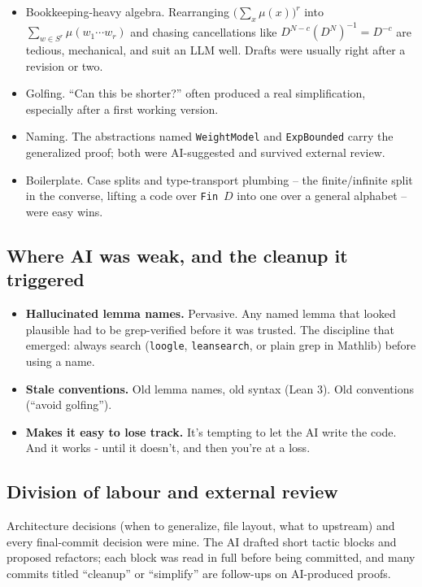 \documentclass[11pt]{article}
\begin{document}
\begin{itemize}[leftmargin=1.5em,itemsep=0pt]
  \item Bookkeeping-heavy algebra. Rearranging
    $\bigl(\sum_x \mu(x)\bigr)^r$ into $\sum_{w \in S^r} \mu(w_1 \cdots w_r)$
    and chasing cancellations like $D^{N-c}(D^N)^{-1} = D^{-c}$ are
    tedious, mechanical, and suit an LLM well. Drafts were usually right
    after a revision or two.
  \item Golfing. ``Can this be shorter?'' often produced a real
    simplification, especially after a first working version.
  \item Naming. The abstractions named \texttt{WeightModel} and
    \texttt{ExpBounded} carry the generalized proof; both were
    AI-suggested and survived external review.
  \item Boilerplate. Case splits and type-transport plumbing -- the
    finite/infinite split in the converse, lifting a code over
    \texttt{Fin}~$D$ into one over a general alphabet -- were easy wins.
\end{itemize}

\subsection*{Where AI was weak, and the cleanup it triggered}

\begin{itemize}[leftmargin=1.5em,itemsep=0pt]
  \item \textbf{Hallucinated lemma names.} Pervasive. Any named lemma that
    looked plausible had to be grep-verified before it was trusted. The
    discipline that emerged: always search (\texttt{loogle},
    \texttt{leansearch}, or plain grep in \textsf{Mathlib}) before using
    a name.
    
  \item \textbf{Stale conventions.} Old lemma names, old syntax (Lean 3). Old conventions (``avoid golfing'').

  \item \textbf{Makes it easy to lose track.} It's tempting to let the AI write the code. And it works - until it doesn't, and then you're at a loss.
\end{itemize}

\subsection*{Division of labour and external review}

Architecture decisions (when to generalize, file layout, what to upstream)
and every final-commit decision were mine. The AI drafted short tactic
blocks and proposed refactors; each block was read in full before being
committed, and many commits titled ``cleanup'' or ``simplify'' are
follow-ups on AI-produced proofs.
\end{document}
